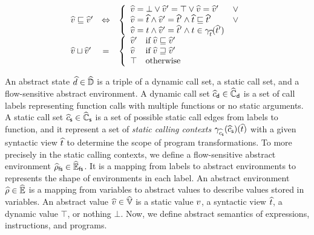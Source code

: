 \begin{itemize}
\[\begin{array}{lcl}
        \widehat{v} \sqsubseteq \widehat{v}' &\Leftrightarrow& \left\{
          \begin{array}{ll}
            \widehat{v} = \bot \vee \widehat{v}' = \top \vee \widehat{v} = \widehat{v}' & \vee\\
            \widehat{v} = \widehat{t} \wedge \widehat{v}' = \widehat{t}' \wedge
            \widehat{t} \sqsubseteq \widehat{t}' &\vee\\
            \widehat{v} = t \wedge \widehat{v}' = \widehat{t}' \wedge t \in
            \gamma_{\widehat{t}}(\widehat{t}')\\
          \end{array}
        \right.\\

        \widehat{v} \sqcup \widehat{v}' &=& \left\{
          \begin{array}{ll}
            \widehat{v}' & \text{if} \; \widehat{v} \sqsubseteq \widehat{v}'\\
            \widehat{v} & \text{if} \; \widehat{v} \sqsupseteq \widehat{v}'\\
            \top & \text{otherwise}\\
          \end{array}
        \right.\\
      \end{array}
    \]
\end{itemize}

An abstract state $\widehat{d} \in \widehat{\mathbb{D}}$ is a triple of a dynamic call set, a
static call set, and a flow-sensitive abstract environment.  A dynamic call set
$\widehat{c}_{\textsf{d}} \in \widehat{\mathbb{C}}_{\textsf{d}}$ is a set of call labels representing function calls
with multiple functions or no static arguments. A static call set $\widehat{c}_{\textsf{s}} \in
\widehat{\mathbb{C}}_{\textsf{s}}$ is a set of possible static call edges from labels to function, and
it represent a set of \textit{static calling contexts}
$\gamma_{\widehat{c}_{\textsf{s}}}(\widehat{c}_{\textsf{s}})(\widehat{t})$ with a given syntactic view $\widehat{t}$ to
determine the scope of program transformations.  To more precisely in the static
calling contexts, we define a flow-sensitive abstract environment $\widehat{\rho}_{\textsf{fs}} \in
\widehat{\mathbb{E}}_{\textsf{fs}}$. It is a mapping from labels to abstract environments to represents
the shape of environments in each label. An abstract environment $\widehat{\rho} \in
\widehat{\mathbb{E}}$ is a mapping from variables to abstract values to describe values
stored in variables. An abstract value $\widehat{v} \in \widehat{\mathbb{V}}$ is a static value
$v$, a syntactic view $\widehat{t}$, a dynamic value $\top$, or nothing $\bot$.
Now, we define abstract semantics of expressions, instructions, and programs.

